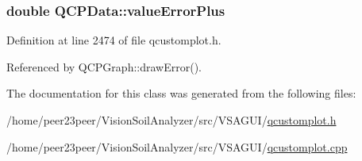 \hypertarget{class_q_c_p_data_ad26912552d03485ea20d91dcad16aa8f}{}
\subsubsection[{value\+Error\+Plus}]{\setlength{\rightskip}{0pt plus 5cm}double Q\+C\+P\+Data\+::value\+Error\+Plus}\label{class_q_c_p_data_ad26912552d03485ea20d91dcad16aa8f}


Definition at line 2474 of file qcustomplot.\+h.



Referenced by Q\+C\+P\+Graph\+::draw\+Error().



The documentation for this class was generated from the following files\+:\begin{DoxyCompactItemize}
\item 
/home/peer23peer/\+Vision\+Soil\+Analyzer/src/\+V\+S\+A\+G\+U\+I/\hyperlink{qcustomplot_8h}{qcustomplot.\+h}\item 
/home/peer23peer/\+Vision\+Soil\+Analyzer/src/\+V\+S\+A\+G\+U\+I/\hyperlink{qcustomplot_8cpp}{qcustomplot.\+cpp}\end{DoxyCompactItemize}
